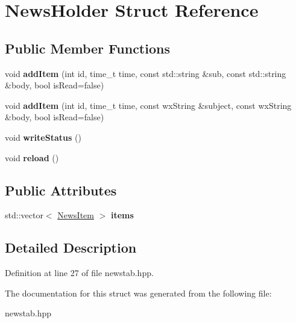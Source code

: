 \hypertarget{struct_news_holder}{\section{News\-Holder Struct Reference}
\label{struct_news_holder}
}
\subsection*{Public Member Functions}
\begin{DoxyCompactItemize}
\item 
\hypertarget{struct_news_holder_a3066673800034ade96e7f9ea0f0f3c38}{void {\bfseries add\-Item} (int id, time\-\_\-t time, const std\-::string \&sub, const std\-::string \&body, bool is\-Read=false)}\label{struct_news_holder_a3066673800034ade96e7f9ea0f0f3c38}

\item 
\hypertarget{struct_news_holder_a40e573fbb8eed20431b25195ae154c48}{void {\bfseries add\-Item} (int id, time\-\_\-t time, const wx\-String \&subject, const wx\-String \&body, bool is\-Read=false)}\label{struct_news_holder_a40e573fbb8eed20431b25195ae154c48}

\item 
\hypertarget{struct_news_holder_ac8fb0907404b1ae52138bac62f8808b6}{void {\bfseries write\-Status} ()}\label{struct_news_holder_ac8fb0907404b1ae52138bac62f8808b6}

\item 
\hypertarget{struct_news_holder_a49e4596d7f38230fb41aa30e1930c2af}{void {\bfseries reload} ()}\label{struct_news_holder_a49e4596d7f38230fb41aa30e1930c2af}

\end{DoxyCompactItemize}
\subsection*{Public Attributes}
\begin{DoxyCompactItemize}
\item 
\hypertarget{struct_news_holder_a5662cdc4eac38a9c6a919a945ad450ff}{std\-::vector$<$ \hyperlink{struct_news_item}{News\-Item} $>$ {\bfseries items}}\label{struct_news_holder_a5662cdc4eac38a9c6a919a945ad450ff}

\end{DoxyCompactItemize}


\subsection{Detailed Description}


Definition at line 27 of file newstab.\-hpp.



The documentation for this struct was generated from the following file\-:\begin{DoxyCompactItemize}
\item 
newstab.\-hpp\end{DoxyCompactItemize}
